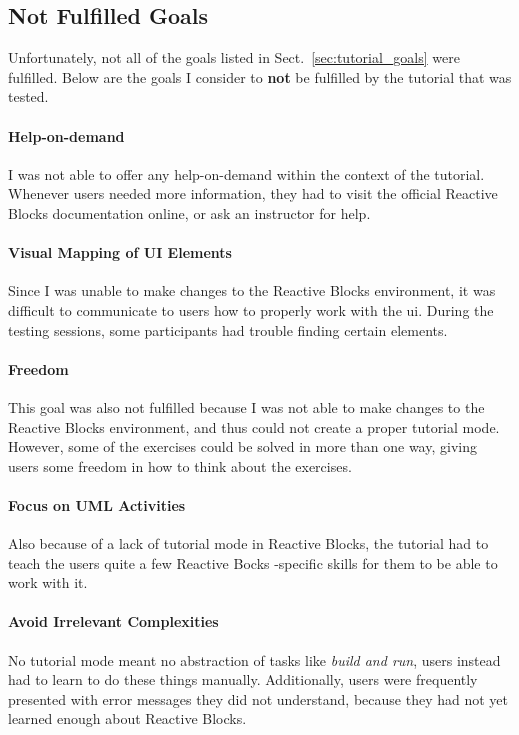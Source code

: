 \subsection{Not Fulfilled Goals}
\label{sec:tutorial_goals_not_fulfilled}
Unfortunately, not all of the goals listed in Sect.~\ref{sec:tutorial_goals} were fulfilled. Below are the goals I consider to \textbf{not} be fulfilled by the tutorial that was tested.

\paragraph{Help-on-demand} I was not able to offer any help-on-demand within the context of the tutorial. Whenever users needed more information, they had to visit the official Reactive Blocks documentation online, or ask an instructor for help.

\paragraph{Visual Mapping of UI Elements} Since I was unable to make changes to the Reactive Blocks environment, it was difficult to communicate to users how to properly work with the \gls{ui}. During the testing sessions, some participants had trouble finding certain elements.

\paragraph{Freedom} This goal was also not fulfilled because I was not able to make changes to the Reactive Blocks environment, and thus could not create a proper tutorial mode. However, some of the exercises could be solved in more than one way, giving users some freedom in how to think about the exercises.

\paragraph{Focus on UML Activities} Also because of a lack of tutorial mode in Reactive Blocks, the tutorial had to teach the users quite a few Reactive Bocks -specific skills for them to be able to work with it.

\paragraph{Avoid Irrelevant Complexities} No tutorial mode meant no abstraction of tasks like \emph{build and run}, users instead had to learn to do these things manually. Additionally, users were frequently presented with error messages they did not understand, because they had not yet learned enough about Reactive Blocks.


